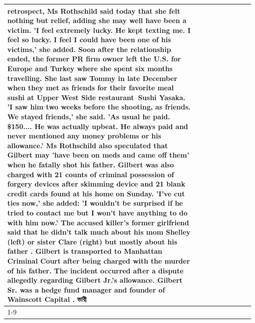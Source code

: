 \begin{table}[H]
\begin{tabular}{lllrlllll}
retrospect, Ms Rothschild said today that she felt nothing but relief, adding she may well have been a victim. 'I feel extremely lucky. He kept texting me. I feel so lucky. I feel I could have been one of his victims,' she added. Soon after the relationship ended, the former PR firm owner left the U.S. for Europe and Turkey where she spent six months  travelling. She last saw Tommy in late December when they met as friends for their favorite meal sushi at Upper West Side restaurant Sushi Yasaka. 'I saw him two weeks before the shooting, as friends. We stayed friends,' she said. 'As usual he paid. \$150.... He was actually upbeat. He always paid and never mentioned any money problems or his allowance.' Ms Rothschild also speculated that Gilbert may 'have been on meds and came off them' when he fatally shot his father. Gilbert was also charged with 21 counts of criminal possession of forgery devices after skimming device and 21 blank credit cards found at his home on Sunday. 'I've cut ties now,' she added: 'I wouldn’t be surprised if he tried to contact me but I won’t have anything to do with him now.' The accused killer's former girlfriend said that he didn't talk much about his mom Shelley (left) or sister Clare (right) but mostly about his father . Gilbert is transported to Manhattan Criminal Court  after being charged with the murder of his father. The incident occurred after a dispute allegedly regarding Gilbert Jr.'s allowance. Gilbert Sr. was a hedge fund manager and founder of Wainscott Capital . ভাবী \\
\cline{1-9} \cline{2-9}

\end{tabular}
\end{table}
